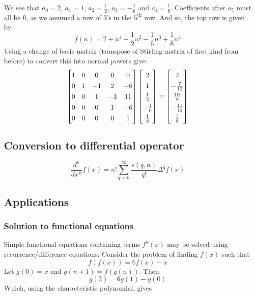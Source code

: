 \documentclass{article}
\renewcommand\({\left(}
\renewcommand\){\right)}
\begin{document}
We see that $a_0=2$, $a_1=1$, $a_2=\frac{1}{2}$, $a_3=-\frac{1}{6}$ and $a_4=\frac{1}{8}$. Coefficients after $a_5$ must all be $0$, as we assumed a row of $3$'s in the $5^{\text{th}}$ row. And so, the top row is given by:
\[f(n)=2+n^{\underline{1}}+\frac{1}{2}n^{\underline{2}}-\frac{1}{6}n^{\underline{3}}+\frac{1}{8}n^{\underline{4}}\]
Using a change of basis matrix (transpose of Stirling matrix of first kind from before) to convert this into normal powers give:
\[\def\arraystretch{1.3}
\begin{bmatrix}
 1 & 0 & 0 & 0 & 0 \\
 0 & 1 & -1 & 2 & -6 \\
 0 & 0 & 1 & -3 & 11 \\
 0 & 0 & 0 & 1 & -6 \\
 0 & 0 & 0 & 0 & 1 \\
\end{bmatrix}
\begin{bmatrix}
 2\\1\\\frac{1}{2}\\-\frac{1}{6}\\\frac{1}{8}
\end{bmatrix}=
\begin{bmatrix}
 2\\-\frac{7}{12}\\\frac{19}{8}\\-\frac{11}{12}\\\frac{1}{8}
\end{bmatrix}
\]


\pagebreak
\subsection{Conversion to differential operator}
\[\frac{d^n}{dx^n}f(x)=n!\sum_{q=n}^\infty \frac{s(q,n)}{q!}\Delta^qf(x)\]
\pagebreak

\subsection{Applications}
\subsubsection{Solution to functional equations}
Simple functional equations containing terms $f^n(x)$ may be solved using recurrence/difference equations:
Consider the problem of finding $f(x)$ such that
\[f(f(x))=6f(x)-x\]
Let $g(0)=x$ and $g(n+1)=f\left(g(n)\right)$. Then:
\[g(2)=6g(1)-g(0)\]
Which, using the characteristic polynomial, gives
\end{document}
